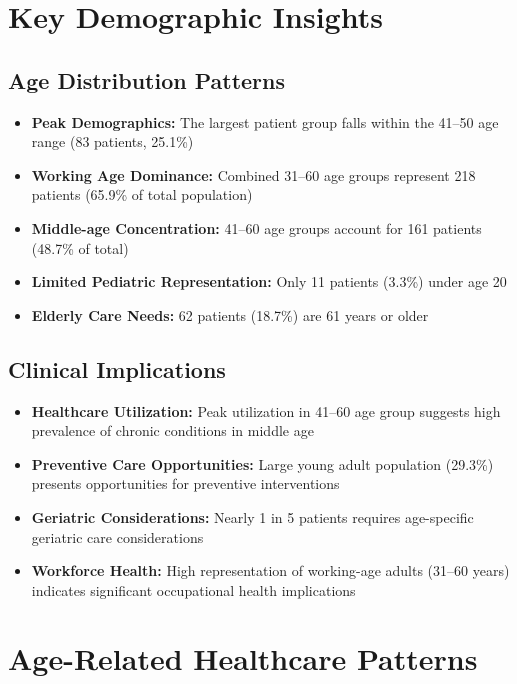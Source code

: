 \documentclass[10pt]{article}
\begin{document}
\section{Key Demographic Insights}

\subsection{Age Distribution Patterns}

\begin{itemize}
\item \textbf{Peak Demographics:} The largest patient group falls within the 41--50 age range (83 patients, 25.1\%)
\item \textbf{Working Age Dominance:} Combined 31--60 age groups represent 218 patients (65.9\% of total population)
\item \textbf{Middle-age Concentration:} 41--60 age groups account for 161 patients (48.7\% of total)
\item \textbf{Limited Pediatric Representation:} Only 11 patients (3.3\%) under age 20
\item \textbf{Elderly Care Needs:} 62 patients (18.7\%) are 61 years or older
\end{itemize}

\subsection{Clinical Implications}

\begin{itemize}
\item \textbf{Healthcare Utilization:} Peak utilization in 41--60 age group suggests high prevalence of chronic conditions in middle age
\item \textbf{Preventive Care Opportunities:} Large young adult population (29.3\%) presents opportunities for preventive interventions
\item \textbf{Geriatric Considerations:} Nearly 1 in 5 patients requires age-specific geriatric care considerations
\item \textbf{Workforce Health:} High representation of working-age adults (31--60 years) indicates significant occupational health implications
\end{itemize}

\section{Age-Related Healthcare Patterns}
\end{document}
